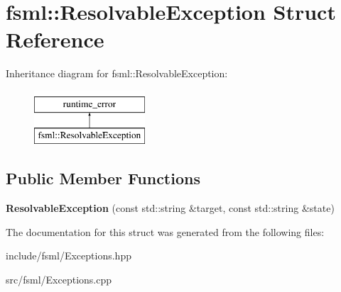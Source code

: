 \hypertarget{structfsml_1_1ResolvableException}{\section{fsml\-:\-:Resolvable\-Exception Struct Reference}
\label{structfsml_1_1ResolvableException}
}
Inheritance diagram for fsml\-:\-:Resolvable\-Exception\-:\begin{figure}[H]
\begin{center}
\leavevmode
\includegraphics[height=2.000000cm]{structfsml_1_1ResolvableException}
\end{center}
\end{figure}
\subsection*{Public Member Functions}
\begin{DoxyCompactItemize}
\item 
\hypertarget{structfsml_1_1ResolvableException_abe17276c3a06e7a331d9e3db7d480af8}{{\bfseries Resolvable\-Exception} (const std\-::string \&target, const std\-::string \&state)}\label{structfsml_1_1ResolvableException_abe17276c3a06e7a331d9e3db7d480af8}

\end{DoxyCompactItemize}


The documentation for this struct was generated from the following files\-:\begin{DoxyCompactItemize}
\item 
include/fsml/Exceptions.\-hpp\item 
src/fsml/Exceptions.\-cpp\end{DoxyCompactItemize}
